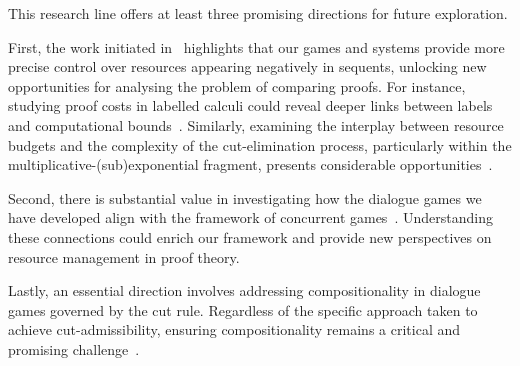
This research line offers at least three promising directions for future exploration.

First, the work initiated in~\cite{DBLP:conf/tableaux/LangOPF19} highlights that our games and systems provide more precise control over resources appearing negatively in sequents, unlocking new opportunities for analysing the problem of comparing proofs. For instance, studying proof costs in labelled calculi could reveal deeper links between labels and computational bounds~\cite{DBLP:journals/jfp/AccattoliGK20}. Similarly, examining the interplay between resource budgets and the complexity of the cut-elimination process, particularly within the multiplicative-(sub)exponential fragment, presents considerable opportunities~\cite{DBLP:journals/tcs/Strassburger03,DBLP:journals/tocl/StrassburgerG11}.

Second, there is substantial value in investigating how the dialogue games we
have developed align with the framework of concurrent
games~\cite{DBLP:conf/lics/AbramskyM99,DBLP:conf/lics/FaggianM05,DBLP:journals/lmcs/CastellanCRW17}.
Understanding these connections could enrich our framework and provide new
perspectives on resource management in proof theory.

Lastly, an essential direction involves addressing compositionality in dialogue games governed by the cut rule. Regardless of the specific approach taken to achieve cut-admissibility, ensuring compositionality remains a critical and promising challenge~\cite{dutilh18}.
